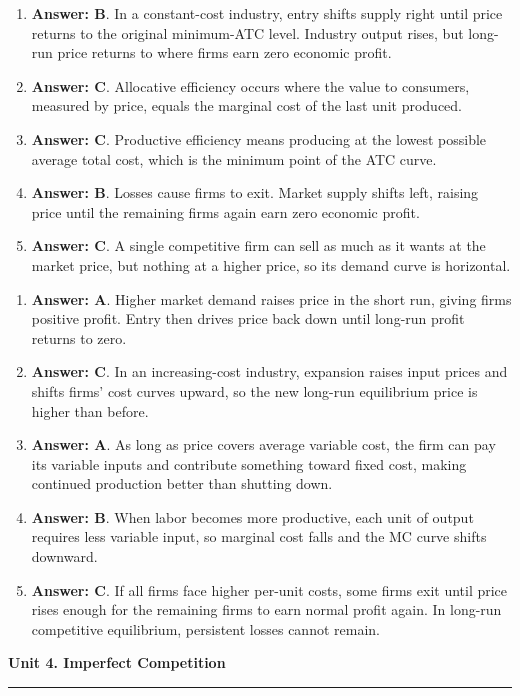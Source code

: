 \documentclass[10pt]{article}
\newcommand{\unitheader}[2]{%
  \vspace{0.35em}
  {\Large\bfseries Unit #1. #2\par}
  \vspace{0.2em}
  \hrule
  \vspace{0.55em}
}
\begin{document}
\begin{enumerate}[resume*=aps, leftmargin=*, itemsep=0.6em, topsep=0.2em, parsep=0pt]
\item \textbf{Answer: B}. In a constant-cost industry, entry shifts supply right until price returns to the original minimum-ATC level. Industry output rises, but long-run price returns to where firms earn zero economic profit.
\item \textbf{Answer: C}. Allocative efficiency occurs where the value to consumers, measured by price, equals the marginal cost of the last unit produced.
\item \textbf{Answer: C}. Productive efficiency means producing at the lowest possible average total cost, which is the minimum point of the ATC curve.
\item \textbf{Answer: B}. Losses cause firms to exit. Market supply shifts left, raising price until the remaining firms again earn zero economic profit.
\item \textbf{Answer: C}. A single competitive firm can sell as much as it wants at the market price, but nothing at a higher price, so its demand curve is horizontal.
\end{enumerate}
\begin{enumerate}[resume*=aps, leftmargin=*, itemsep=0.6em, topsep=0.2em, parsep=0pt]
\item \textbf{Answer: A}. Higher market demand raises price in the short run, giving firms positive profit. Entry then drives price back down until long-run profit returns to zero.
\item \textbf{Answer: C}. In an increasing-cost industry, expansion raises input prices and shifts firms' cost curves upward, so the new long-run equilibrium price is higher than before.
\item \textbf{Answer: A}. As long as price covers average variable cost, the firm can pay its variable inputs and contribute something toward fixed cost, making continued production better than shutting down.
\item \textbf{Answer: B}. When labor becomes more productive, each unit of output requires less variable input, so marginal cost falls and the MC curve shifts downward.
\item \textbf{Answer: C}. If all firms face higher per-unit costs, some firms exit until price rises enough for the remaining firms to earn normal profit again. In long-run competitive equilibrium, persistent losses cannot remain.
\end{enumerate}
\unitheader{4}{Imperfect Competition}
\end{document}
